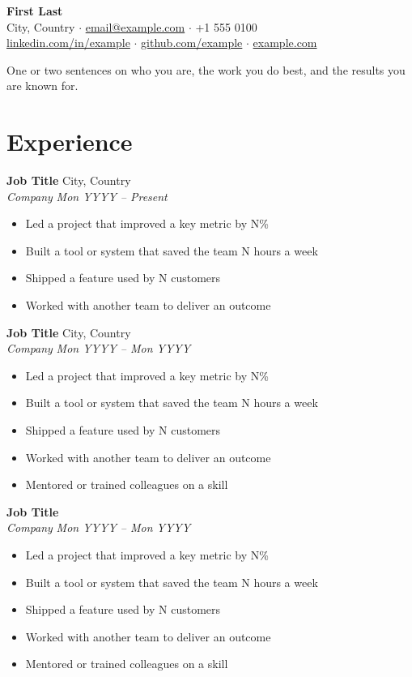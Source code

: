 \documentclass[11pt,letterpaper]{article}
\newcommand{\role}[4]{%
  \noindent\textbf{#1} \hfill #4 \\
  \textit{#2} \hfill \textit{#3}\par
}
\begin{document}
\begin{center}
  {\LARGE\textbf{First Last}} \\[3pt]
  City, Country \enspace$\cdot$\enspace
  \href{mailto:email@example.com}{email@example.com} \enspace$\cdot$\enspace
  +1 555 0100 \\
  \href{https://linkedin.com/in/example}{linkedin.com/in/example} \enspace$\cdot$\enspace
  \href{https://github.com/example}{github.com/example} \enspace$\cdot$\enspace
  \href{https://example.com}{example.com}
\end{center}

\noindent One or two sentences on who you are, the work you do best, and the results you are known for.
\vspace{4pt}

\section{Experience}

\role{Job Title}{Company}{Mon YYYY -- Present}{City, Country}
\begin{itemize}
  \item Led a project that improved a key metric by N\%
  \item Built a tool or system that saved the team N hours a week
  \item Shipped a feature used by N customers
  \item Worked with another team to deliver an outcome
\end{itemize}
\vspace{4pt}

\role{Job Title}{Company}{Mon YYYY -- Mon YYYY}{City, Country}
\begin{itemize}
  \item Led a project that improved a key metric by N\%
  \item Built a tool or system that saved the team N hours a week
  \item Shipped a feature used by N customers
  \item Worked with another team to deliver an outcome
  \item Mentored or trained colleagues on a skill
\end{itemize}
\vspace{4pt}

\role{Job Title}{Company}{Mon YYYY -- Mon YYYY}{}
\begin{itemize}
  \item Led a project that improved a key metric by N\%
  \item Built a tool or system that saved the team N hours a week
  \item Shipped a feature used by N customers
  \item Worked with another team to deliver an outcome
  \item Mentored or trained colleagues on a skill
\end{itemize}
\vspace{4pt}
\end{document}
